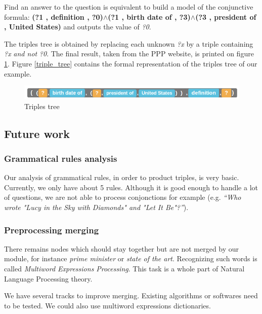 Find an answer to the question is equivalent to build a model of the conjunctive formula: \textbf{(?1 , definition , ?0)$\wedge$(?1 , birth date of , ?3)$\wedge$(?3 , president of , United States)} and outputs the value of \textit{?0}.

The triples tree is obtained by replacing each unknown \textit{?x} by a triple containing \textit{?x} \textit{and not} \textit{?0}. The final result, taken from the PPP website, is printed on figure \ref{tree_four}. Figure \ref{triple_tree} contains the formal representation of the triples tree of our example.

\begin{figure}[!h]
  \centering
  \caption{Triples tree}
  \label{tree_four}
    \includegraphics[scale=0.5]{../examples_NLP_grammatical/final_result.png}
\end{figure}


\subsection{Future work}

\subsubsection{Grammatical rules analysis}

Our analysis of grammatical rules, in order to product triples, is very basic. Currently, we only have about 5 rules. Although it is good enough to handle a lot of questions, we are not able to process conjonctions for example (e.g. \textit{``Who wrote "Lucy in the Sky with Diamonds" and "Let It Be"?''}).

\subsubsection{Preprocessing merging}

There remains nodes which should stay together but are not merged by our module, for instance \emph{prime minister} or \emph{state of the art}. Recognizing such words is called \emph{Multiword Expressions Processing}. This task is a whole part of Natural Language Processing theory. 

We have several tracks to improve merging. Existing algorithms or softwares need to be tested. We could also use multiword expressions dictionaries.

